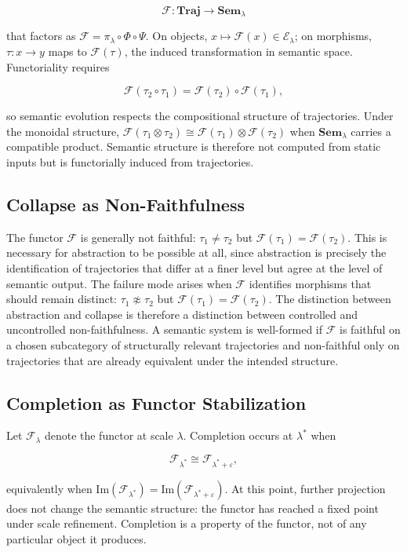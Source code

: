 \documentclass[11pt, twoside]{article}
\theoremstyle{plain}
\theoremstyle{definition}
\theoremstyle{remark}
\begin{document}
\[
\mathcal{F} : \mathbf{Traj} \to \mathbf{Sem}_\lambda
\]

that factors as $\mathcal{F} = \pi_\lambda \circ \Phi \circ \Psi$. On objects, $x \mapsto \mathcal{F}(x) \in \mathcal{E}_\lambda$; on morphisms, $\tau : x \to y$ maps to $\mathcal{F}(\tau)$, the induced transformation in semantic space. Functoriality requires

\[
\mathcal{F}(\tau_2 \circ \tau_1) = \mathcal{F}(\tau_2) \circ \mathcal{F}(\tau_1),
\]

so semantic evolution respects the compositional structure of trajectories. Under the monoidal structure, $\mathcal{F}(\tau_1 \otimes \tau_2) \cong \mathcal{F}(\tau_1) \otimes \mathcal{F}(\tau_2)$ when $\mathbf{Sem}_\lambda$ carries a compatible product. Semantic structure is therefore not computed from static inputs but is functorially induced from trajectories.

\subsection{Collapse as Non-Faithfulness}

The functor $\mathcal{F}$ is generally not faithful: $\tau_1 \neq \tau_2$ but $\mathcal{F}(\tau_1) = \mathcal{F}(\tau_2)$. This is necessary for abstraction to be possible at all, since abstraction is precisely the identification of trajectories that differ at a finer level but agree at the level of semantic output. The failure mode arises when $\mathcal{F}$ identifies morphisms that should remain distinct: $\tau_1 \not\approx \tau_2$ but $\mathcal{F}(\tau_1) = \mathcal{F}(\tau_2)$. The distinction between abstraction and collapse is therefore a distinction between controlled and uncontrolled non-faithfulness. A semantic system is well-formed if $\mathcal{F}$ is faithful on a chosen subcategory of structurally relevant trajectories and non-faithful only on trajectories that are already equivalent under the intended structure.

\subsection{Completion as Functor Stabilization}

Let $\mathcal{F}_\lambda$ denote the functor at scale $\lambda$. Completion occurs at $\lambda^*$ when

\[
\mathcal{F}_{\lambda^*} \cong \mathcal{F}_{\lambda^* + \varepsilon},
\]

equivalently when $\mathrm{Im}(\mathcal{F}_{\lambda^*}) = \mathrm{Im}(\mathcal{F}_{\lambda^* + \varepsilon})$. At this point, further projection does not change the semantic structure: the functor has reached a fixed point under scale refinement. Completion is a property of the functor, not of any particular object it produces.
\end{document}
